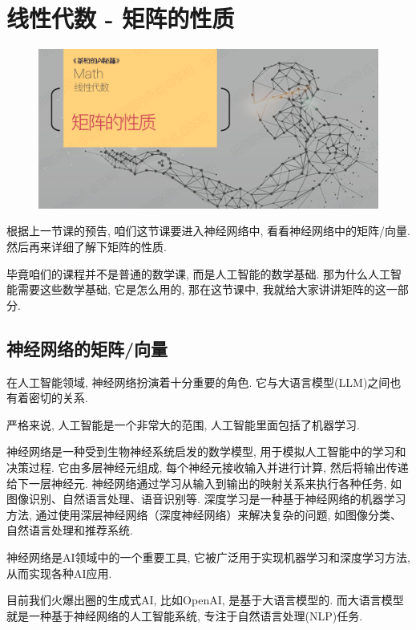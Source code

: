 \chapter{线性代数 - 矩阵的性质 }

\begin{figure}[ht]
  \centering
  \includegraphics[width=1\linewidth]{asset/茶桁的AI秘籍_Math_16.png}
\end{figure}

\newpage

根据上一节课的预告, 咱们这节课要进入神经网络中, 看看神经网络中的矩阵/向量. 然后再来详细了解下矩阵的性质. 

毕竟咱们的课程并不是普通的数学课, 而是人工智能的数学基础. 那为什么人工智能需要这些数学基础, 它是怎么用的, 那在这节课中, 我就给大家讲讲矩阵的这一部分. 

\section{神经网络的矩阵/向量}

在人工智能领域, 神经网络扮演着十分重要的角色. 它与大语言模型(LLM)之间也有着密切的关系. 

严格来说, 人工智能是一个非常大的范围, 人工智能里面包括了机器学习. 

神经网络是一种受到生物神经系统启发的数学模型, 用于模拟人工智能中的学习和决策过程. 它由多层神经元组成, 每个神经元接收输入并进行计算, 然后将输出传递给下一层神经元. 神经网络通过学习从输入到输出的映射关系来执行各种任务, 如图像识别、自然语言处理、语音识别等. 深度学习是一种基于神经网络的机器学习方法, 通过使用深层神经网络（深度神经网络）来解决复杂的问题, 如图像分类、自然语言处理和推荐系统. 

神经网络是AI领域中的一个重要工具, 它被广泛用于实现机器学习和深度学习方法, 从而实现各种AI应用. 

目前我们火爆出圈的生成式AI, 比如OpenAI, 是基于大语言模型的. 而大语言模型就是一种基于神经网络的人工智能系统, 专注于自然语言处理(NLP)任务. 


